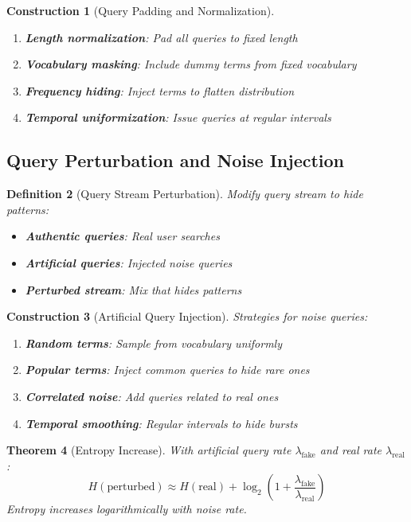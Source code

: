 \documentclass[11pt,final]{article}
\newtheorem{theorem}{Theorem}[section]
\newtheorem{definition}[theorem]{Definition}
\newtheorem{construction}[theorem]{Construction}
\begin{document}
\begin{construction}[Query Padding and Normalization]
\begin{enumerate}
    \item \textbf{Length normalization}: Pad all queries to fixed length
    \item \textbf{Vocabulary masking}: Include dummy terms from fixed vocabulary
    \item \textbf{Frequency hiding}: Inject terms to flatten distribution
    \item \textbf{Temporal uniformization}: Issue queries at regular intervals
\end{enumerate}
\end{construction}

\subsection{Query Perturbation and Noise Injection}

\begin{definition}[Query Stream Perturbation]
Modify query stream to hide patterns:
\begin{itemize}
    \item \textbf{Authentic queries}: Real user searches
    \item \textbf{Artificial queries}: Injected noise queries
    \item \textbf{Perturbed stream}: Mix that hides patterns
\end{itemize}
\end{definition}

\begin{construction}[Artificial Query Injection]
Strategies for noise queries:
\begin{enumerate}
    \item \textbf{Random terms}: Sample from vocabulary uniformly
    \item \textbf{Popular terms}: Inject common queries to hide rare ones
    \item \textbf{Correlated noise}: Add queries related to real ones
    \item \textbf{Temporal smoothing}: Regular intervals to hide bursts
\end{enumerate}
\end{construction}

\begin{theorem}[Entropy Increase]
With artificial query rate $\lambda_{\text{fake}}$ and real rate $\lambda_{\text{real}}$:
\begin{equation}
H(\text{perturbed}) \approx H(\text{real}) + \log_2\left(1 + \frac{\lambda_{\text{fake}}}{\lambda_{\text{real}}}\right)
\end{equation}
Entropy increases logarithmically with noise rate.
\end{theorem}
\end{document}
